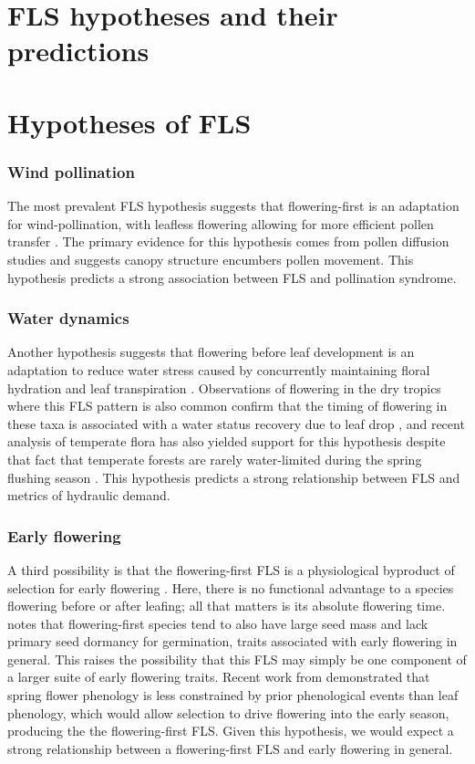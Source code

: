 \documentclass{article}
\begin{document}
\section*{FLS hypotheses and their predictions}
\section*{Hypotheses of FLS}
\subsubsection*{ Wind pollination}
\noindent The most prevalent FLS hypothesis suggests that flowering-first is an adaptation for wind-pollination, with leafless flowering allowing for more efficient pollen transfer \citep{Whitehead1969,Friedman2009}. The primary evidence for this hypothesis comes from pollen diffusion studies \citep[e.g., particle movement through closed and open canopies,][]{Niklas1985,Nathan2005, Milleron2012} and suggests canopy structure encumbers pollen movement. This hypothesis predicts a strong association between FLS and pollination syndrome.
\subsubsection*{Water dynamics}
\noindent Another hypothesis suggests that flowering before leaf development is an adaptation to reduce water stress caused by concurrently maintaining floral hydration and leaf transpiration \citep{Franklin2016}. Observations of flowering in the dry tropics where this FLS pattern is also common confirm that the timing of flowering in these taxa is associated with a water status recovery due to leaf drop \citep{Borchert1983,Reich1984}, and recent analysis of temperate flora has also yielded support for this hypothesis despite that fact that temperate forests are rarely water-limited during the spring flushing season \citep{Gougherty2018}. This hypothesis predicts a strong relationship between FLS and metrics of hydraulic demand.
 
\subsubsection*{Early flowering}
\noindent A third possibility is that the flowering-first FLS is a physiological byproduct of selection for early flowering \citep{Primack1987}. Here, there is no functional advantage to a species flowering before or after leafing; all that matters is its absolute flowering time. \citet{Primack1987} notes that flowering-first species tend to also have large seed mass and lack primary seed dormancy for germination, traits associated with early flowering in general. This raises the possibility that this FLS may simply be one component of a larger suite of early flowering traits. Recent work from \citet{Savage2019} demonstrated that spring flower phenology is less constrained by prior phenological events than leaf phenology, which would allow selection to drive flowering into the early season, producing the the flowering-first FLS. Given this hypothesis, we would expect a strong relationship between a flowering-first FLS and early flowering in general.
\end{document}
